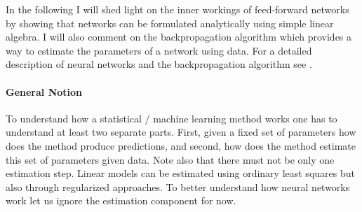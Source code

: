 In the following I will shed light on the inner workings of feed-forward networks by
showing that networks can be formulated analytically using simple linear algebra. I will
also comment on the backpropagation algorithm which provides a way to estimate the
parameters of a network using data. For a detailed description of neural networks and
the backpropagation algorithm see \cite{Goodfellow.2016, Murphy.2012, Hastie.2008}.

\paragraph{General Notion}

To understand how a statistical / machine learning method works one has to understand at
least two separate parts. First, given a fixed set of parameters how does the method
produce predictions, and second, how does the method estimate this set of parameters
given data. Note also that there must not be only one estimation step. Linear models can
be estimated using ordinary least squares but also through regularized approaches. To
better understand how neural networks work let us ignore the estimation component for
now.


